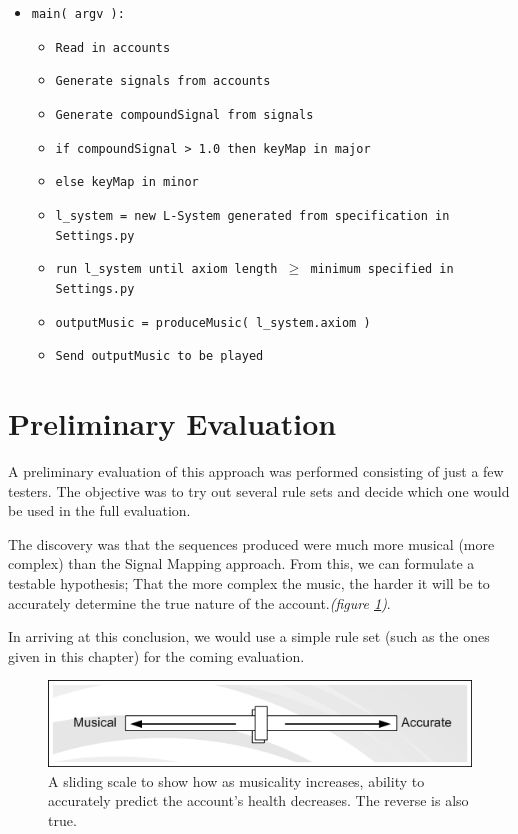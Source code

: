 \begin{singlespace}
\begin{formality}
\begin{itemize}
	\item[\textbullet] \texttt{main( argv ):}
	\begin{itemize}
		\item[\textbullet] \texttt{Read in accounts}
		\item[\textbullet] \texttt{Generate signals from accounts}
		\item[\textbullet] \texttt{Generate compoundSignal from signals}
		\item[\textbullet] \texttt{if compoundSignal > 1.0 then keyMap in major}
		\item[\textbullet] \texttt{else keyMap in minor}
		\item[\textbullet] \texttt{l\_system = new L-System generated from specification in Settings.py}
		\item[\textbullet] \texttt{run l\_system until axiom length $\geq$ minimum specified in Settings.py}
		\item[\textbullet] \texttt{outputMusic = produceMusic( l\_system.axiom )}
		\item[\textbullet] \texttt{Send outputMusic to be played}
	\end{itemize}
\end{itemize}
\end{formality}
\end{singlespace}

\section{Preliminary Evaluation}

A preliminary evaluation of this approach was performed consisting of just a few testers. The objective was to try out several rule sets and decide which one would be used in the full evaluation.

The discovery was that the sequences produced were much more musical (more complex) than the Signal Mapping approach. From this, we can formulate a testable hypothesis; That the more complex the music, the harder it will be to accurately determine the true nature of the account.\textit{(figure \ref{fig:slider1})}.

In arriving at this conclusion, we would use a simple rule set (such as the ones given in this chapter) for the coming evaluation.

\begin{figure}[ht]
\centering
\includegraphics[scale=1.5]{slider1}
\caption{A sliding scale to show how as musicality increases, ability to accurately predict the account's health decreases. The reverse is also true.}
\label{fig:slider1}
\end{figure}

